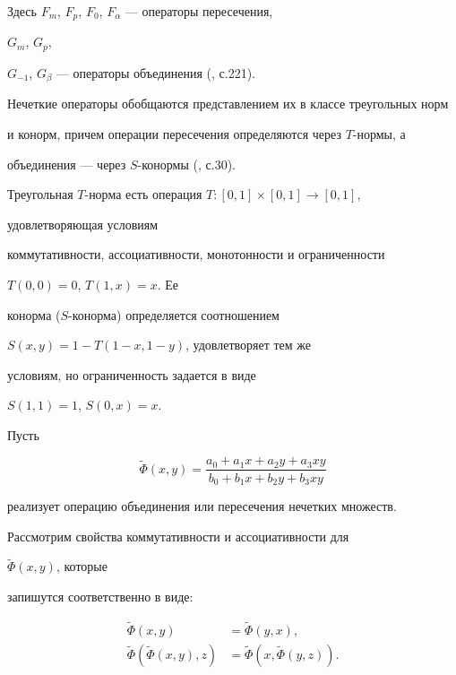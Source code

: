 Здесь $F_m$, $F_p$, $F_0$, $F_\alpha$ --- операторы пересечения,


$G_m$, $G_p$,


$G_{-1}$, $G_\beta$ --- операторы объединения (\cite{Tri}, с.221).





Нечеткие операторы обобщаются представлением их в классе треугольных норм


и конорм, причем операции пересечения определяются через $T$-нормы, а


объединения --- через $S$-конормы (\cite{Pos}, с.30).





Треугольная $T$-норма есть операция $T:[0,1]\times[0,1]\to[0,1]$,


удовлетворяющая условиям


коммутативности, ассоциативности, монотонности и ограниченности


$T(0,0)=0$, $T(1,x)=x$. Ее


конорма ($S$-конорма) определяется соотношением


$S(x,y)=1-T(1-x,1-y)$, удовлетворяет тем же


условиям, но ограниченность задается в виде


$S(1,1)=1$, $S(0,x)=x$.





Пусть


\begin{equation}


\widetilde\Phi(x,y)=\frac{a_0+a_1x+a_2y+a_3xy}


{b_0+b_1x+b_2y+b_3xy}


\end{equation}


реализует операцию объединения или пересечения нечетких множеств.





Рассмотрим свойства коммутативности и ассоциативности для


$\widetilde\Phi(x,y)$, которые


запишутся соответственно в виде:


\begin{align}


\widetilde\Phi(x,y)&=\widetilde\Phi(y,x),\\


\widetilde\Phi(\widetilde\Phi(x,y),z)&=


\widetilde\Phi(x,\widetilde\Phi(y,z)).


\end{align}





